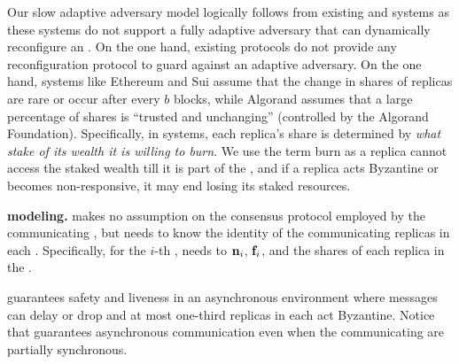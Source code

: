 \Ped{}
Our slow adaptive adversary model logically follows from existing \BFT{} and \PoS{} systems as
these systems do not support a fully adaptive adversary that can dynamically reconfigure an \RSM{}.
On the one hand, existing \BFT{} protocols do not provide any reconfiguration protocol to
guard against an adaptive adversary.
On the one hand, \PoS{} systems like Ethereum and Sui assume that the change in shares of replicas 
are rare or occur after every $b$ blocks, while
Algorand assumes that a large percentage of shares is ``trusted and unchanging''
(controlled by the Algorand Foundation).
Specifically, in \PoS{} systems, each replica's share is determined by {\em what stake of its wealth 
it is willing to burn}.
We use the term burn as a replica cannot access the staked wealth till it is part of the \RSM{}, 
and if a replica acts Byzantine or becomes non-responsive, it may end losing its staked resources.




{\bf \Scrooge{} modeling.}
\Scrooge{} makes no assumption on the consensus protocol employed by the communicating ,
but needs to know the identity of the communicating replicas in each \RSM{}. 
Specifically, for the $i$-th \RSM{}, \Scrooge{} needs to $\textbf{n}_{i}$, $\textbf{f}_{i}$,
and the shares of each replica in the \RSM{}.

\Scrooge{} guarantees safety and liveness in an asynchronous environment where messages 
can delay or drop and at most one-third replicas in each \RSM{} act Byzantine.
Notice that \Scrooge{} guarantees asynchronous communication even when the communicating 
 are partially synchronous.


